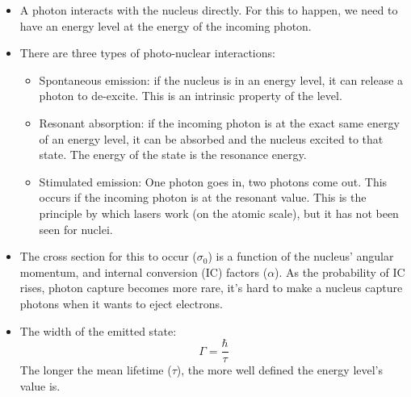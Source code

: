 \documentclass[letter]{article}
\begin{document}
\begin{itemize}
\item A photon interacts with the nucleus directly. For this to
  happen, we need to have an energy level at the energy of the
  incoming photon.~\cite[Lec 25]{lecture}
\item There are three types of photo-nuclear interactions:
  \begin{itemize}
  \item Spontaneous emission: if the nucleus is in an energy level, it
    can release a photon to de-excite. This is an intrinsic property
    of the level.
  \item Resonant absorption: if the incoming photon is at the exact same energy
    of an energy level, it can be absorbed and the nucleus excited to
    that state. The energy of the state is the resonance energy.
  \item Stimulated emission: One photon goes in, two photons come
    out. This occurs if the incoming photon is at the resonant
    value. This is the principle by which lasers work (on the atomic
    scale), but it has not been seen for nuclei.
  \end{itemize}
  \cite[Lec 25]{lecture}
\item The cross section for this to occur ($\sigma_0$) is a function
  of the nucleus' angular momentum, and internal conversion (IC)
  factors ($\alpha$). As the probability of IC rises, photon capture
  becomes more rare, it's hard to make a nucleus capture photons when
  it wants to eject electrons.~\cite[Lec 25]{lecture}
\item The width of the emitted state:
  \begin{equation*}
    \Gamma = \frac{\hbar}{\tau}
  \end{equation*}
The longer the mean lifetime ($\tau$), the more well defined the
energy level's value is.~\cite[Lec 25]{lecture}
\end{itemize}
\end{document}
